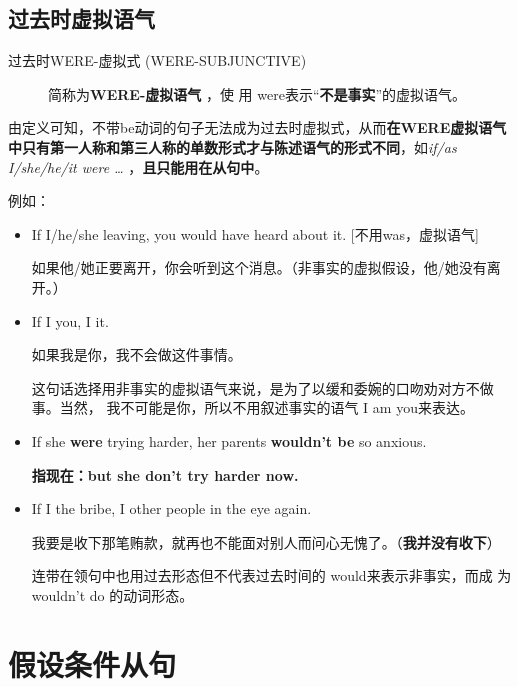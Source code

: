 \subsection{过去时虚拟语气}

\begin{description}
\item[过去时WERE-虚拟式 (WERE-SUBJUNCTIVE)] 简称为\textbf{WERE-虚拟语气} ，使
  用 were表示“\textbf{不是事实}”的虚拟语气。
\end{description}

由定义可知，不带be动词的句子无法成为过去时虚拟式，从而\textbf{在WERE虚拟语气
  中只有第一人称和第三人称的单数形式才与陈述语气的形式不同}，如\emph{if/as
  I/she/he/it were \ldots{} }，\textbf{且只能用在从句中}。

例如：
\begin{itemize}
\item If I/he/she  leaving, you would have heard about it.
  [不用was，虚拟语气]

  如果他/她正要离开，你会听到这个消息。（非事实的虚拟假设，他/她没有离开。）

\item If I  you, I  it.

  如果我是你，我不会做这件事情。

  这句话选择用非事实的虚拟语气来说，是为了以缓和委婉的口吻劝对方不做事。当然，
  我不可能是你，所以不用叙述事实的语气 I am you来表达。

\item If she \textbf{were} trying harder, her parents \textbf{wouldn't be} so anxious.

  \textbf{指现在：but she don't try harder now.}

\item If I  the bribe, I 
  other people in the eye again.

  我要是收下那笔贿款，就再也不能面对别人而问心无愧了。（\textbf{我并没有收下}）

  连带在领句中也用过去形态但不代表过去时间的 would来表示非事实，而成
  为 wouldn't do 的动词形态。
\end{itemize}



\section{假设条件从句}
\label{sec:hypoverb}

